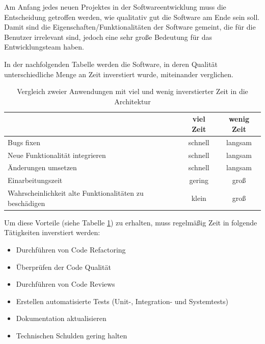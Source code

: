 

    Am Anfang jedes neuen Projektes in der Softwareentwicklung muss die Entscheidung getroffen werden, wie qualitativ gut die Software am Ende sein soll.
    Damit sind die Eigenschaften/Funktionalitäten der Software gemeint, die für die Benutzer irrelevant sind, jedoch eine sehr große Bedeutung 
    für das Entwicklungsteam haben.
    
    In der nachfolgenden Tabelle werden die Software, 
    in deren Qualität unterschiedliche Menge an Zeit inverstiert wurde, miteinander verglichen.

    \begin{table}[h!]
        \centering
    \begin{tabular}{ |l|c|c| } 
        \hline
                                                                & viel Zeit & wenig Zeit \\ 
                                                                \hline
        Bugs fixen                                              & schnell       & langsam \\ 
        Neue Funktionalität integrieren                         & schnell       & langsam \\
        Änderungen umsetzen                                     & schnell       & langsam \\ 
        Einarbeitungszeit                                       & gering        & groß \\
        Wahrscheinlichkeit alte Funktionalitäten zu beschädigen & klein       & groß \\
        \hline

       \end{tabular}
       \caption{Vergleich zweier Anwendungen mit viel und wenig inverstierter Zeit in die Architektur}
       \label{tab:compareGoodAndBadArchitecture}
    \end{table}

    Um diese Vorteile (siehe Tabelle \ref{tab:compareGoodAndBadArchitecture}) zu erhalten, muss regelmäßig Zeit in folgende Tätigkeiten inverstiert werden:
    \begin{itemize}
        \item Durchführen von Code Refactoring
        \item Überprüfen der Code Qualität
        \item Durchführen von Code Reviews
        \item Erstellen automatisierte Tests (Unit-, Integration- und Systemtests)
        \item Dokumentation aktualisieren
        \item Technischen Schulden gering halten
    \end{itemize}

